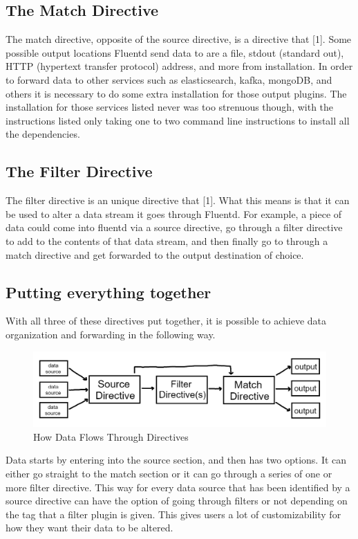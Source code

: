 \documentclass{article}
\begin{document}
\subsection{The Match Directive}
\quad \quad The match directive, opposite of the source directive, is a directive that [1]. Some possible output locations Fluentd 
send data to are a file, stdout (standard out), HTTP (hypertext transfer protocol) address, and more from installation. In order to forward data to
other services such as elasticsearch, kafka, mongoDB, and others it is necessary to do some extra installation for those output plugins. The installation for those services
listed never was too strenuous though, with the instructions listed only taking one to two command line instructions to install all the dependencies.
\subsection{The Filter Directive}
\quad \quad The filter directive is an unique directive that [1]. What this means is that it can be used to alter a data stream
it goes through Fluentd. For example, a piece of data could come into fluentd via a source directive, go through a filter directive to add to the contents of that data stream, and
then finally go to through a match directive and get forwarded to the output destination of choice.
\subsection{Putting everything together}
\quad \quad With all three of these directives put together, it is possible to achieve data organization and forwarding in the following way.
\begin{figure}[H]
    \centering
    \includegraphics[scale=1]{images/how_it_works.png}
    \caption{How Data Flows Through Directives}
    \label{fig:pic2}
\end{figure}
Data starts by entering into the source section, and then has two options. It can either go straight to the match section or it can go through a series of one or more filter directive. 
This way for every data source that has been identified by a source directive can have the option of going through filters or not depending on the tag that a filter plugin is given. This 
gives users a lot of customizability for how they want their data to be altered.
\end{document}
